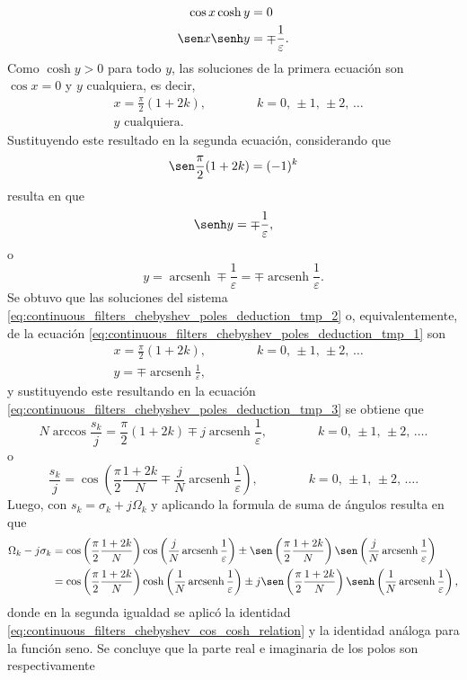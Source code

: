\documentclass[a4paper]{report}
\DeclareMathOperator{\arcsenh}{arcsenh}
\begin{document}
\begin{equation}\label{eq:continuous_filters_chebyshev_poles_deduction_tmp_2}
 \begin{aligned}
   \cos x\cosh y&=0\\
   \sen x\senh y&=\mp\frac{1}{\varepsilon}. 
 \end{aligned}
\end{equation}
Como \(\cosh y>0\) para todo \(y\), las soluciones de la primera ecuación son \(\cos x=0\) y \(y\) cualquiera, es decir,
\begin{align*}
  &x=\frac{\pi}{2}(1+2k),
 \qquad\qquad k=0,\,\pm1,\,\pm2,\,\dots\\
  &y\textrm{ cualquiera.}
\end{align*}
Sustituyendo este resultado en la segunda ecuación, considerando que 
\[
 \sen\frac{\pi}{2}(1+2k)=(-1)^k
\]
resulta en que 
\[
 \senh y=\mp\frac{1}{\varepsilon}, 
\]
o
\[
 y=\arcsenh\mp\frac{1}{\varepsilon}=\mp\arcsenh\frac{1}{\varepsilon}.
\]
Se obtuvo que las soluciones del sistema \ref{eq:continuous_filters_chebyshev_poles_deduction_tmp_2} o, equivalentemente, de la ecuación \ref{eq:continuous_filters_chebyshev_poles_deduction_tmp_1} son
\begin{align*}
  &x=\frac{\pi}{2}(1+2k),
 \qquad\qquad k=0,\,\pm1,\,\pm2,\,\dots\\
  &y=\mp\arcsenh\frac{1}{\varepsilon},
\end{align*}
y sustituyendo este resultando en la ecuación \ref{eq:continuous_filters_chebyshev_poles_deduction_tmp_3} se obtiene que 
\[
 N\arccos\frac{s_k}{j}=\frac{\pi}{2}(1+2k)\mp j\arcsenh\frac{1}{\varepsilon},
 \qquad\qquad k=0,\,\pm1,\,\pm2,\,\dots.
\]
o
\[
 \frac{s_k}{j}=\cos\left(\frac{\pi}{2}\frac{1+2k}{N}\mp\frac{j}{N}\arcsenh\frac{1}{\varepsilon}\right),
 \qquad\qquad k=0,\,\pm1,\,\pm2,\,\dots.
\]
Luego, con \(s_k=\sigma_k+j\Omega_k\) y aplicando la formula de suma de ángulos resulta en que 
\begin{align*}
 \Omega_k-j\sigma_k&=\cos\left(\frac{\pi}{2}\frac{1+2k}{N}\right)\cos\left(\frac{j}{N}\arcsenh\frac{1}{\varepsilon}\right)
   \pm\sen\left(\frac{\pi}{2}\frac{1+2k}{N}\right)\sen\left(\frac{j}{N}\arcsenh\frac{1}{\varepsilon}\right)\\
   &=\cos\left(\frac{\pi}{2}\frac{1+2k}{N}\right)\cosh\left(\frac{1}{N}\arcsenh\frac{1}{\varepsilon}\right)
   \pm j\sen\left(\frac{\pi}{2}\frac{1+2k}{N}\right)\senh\left(\frac{1}{N}\arcsenh\frac{1}{\varepsilon}\right),
\end{align*}
donde en la segunda igualdad se aplicó la identidad \ref{eq:continuous_filters_chebyshev_cos_cosh_relation} y la identidad análoga para la función seno. Se concluye que la parte real e imaginaria de los polos son respectivamente
\end{document}
